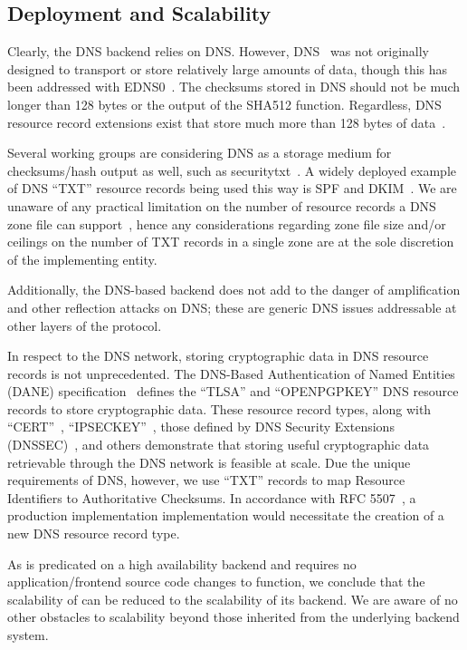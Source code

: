 \subsection{Deployment and Scalability}


Clearly, the DNS backend relies on DNS. However, DNS~\cite{DNS1} was not
originally designed to transport or store relatively large amounts of data,
though this has been addressed with EDNS0~\cite{EDNS}. The checksums stored in
DNS should not be much longer than 128 bytes or the output of the SHA512
function. Regardless, DNS resource record extensions exist that store much more
than 128 bytes of data~\cite{CERT, IPSECKEY, DANE3, DANE1}.

Several working groups are considering DNS as a storage medium for
checksums/hash output as well, such as securitytxt~\cite{draft-sectxt}. A widely
deployed example of DNS ``TXT'' resource records being used this way is SPF and
DKIM~\cite{DKIM}. We are unaware of any practical limitation on the number of
resource records a DNS zone file can support~\cite{DNS1}, hence any
considerations regarding zone file size and/or ceilings on the number of TXT
records in a single zone are at the sole discretion of the implementing entity.

Additionally, the DNS-based backend does not add to the danger of amplification
and other reflection attacks on DNS; these are generic DNS issues addressable at
other layers of the protocol.

In respect to the DNS network, storing cryptographic data in DNS resource
records is not unprecedented. The DNS-Based Authentication of Named Entities
(DANE) specification~\cite{DANE1, DANE2, DANE3} defines the ``TLSA'' and
``OPENPGPKEY'' DNS resource records to store cryptographic data. These resource
record types, along with ``CERT''~\cite{CERT}, ``IPSECKEY''~\cite{IPSECKEY},
those defined by DNS Security Extensions (DNSSEC)~\cite{DNSSEC}, and others
demonstrate that storing useful cryptographic data retrievable through the DNS
network is feasible at scale. Due the unique requirements of DNS, however, we
use ``TXT'' records to map Resource Identifiers to Authoritative Checksums. In
accordance with RFC 5507~\cite{RFC5507}, a production implementation
implementation would necessitate the creation of a new DNS resource record type.

As \SYSTEM{} is predicated on a high availability backend and
requires no application/frontend source code changes to function, we conclude
that the scalability of \SYSTEM{} can be reduced to the scalability of its
backend. We are aware of no other obstacles to scalability beyond those
inherited from the underlying backend system.

